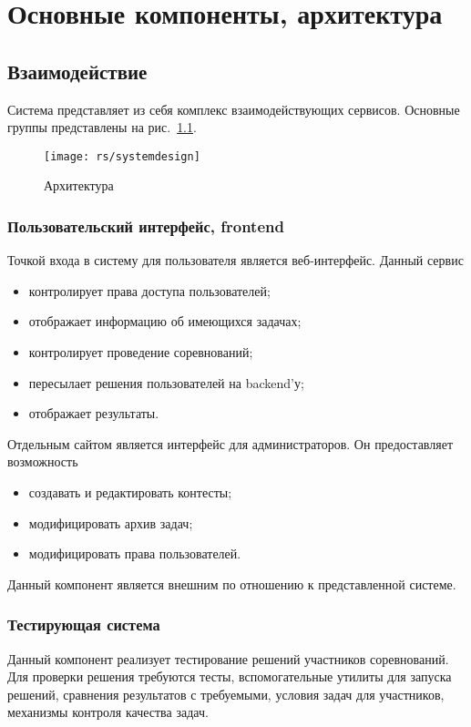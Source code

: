 \chapter{Основные компоненты, архитектура}

\section{Взаимодействие}
Система представляет из себя комплекс взаимодействующих сервисов.
Основные группы представлены на рис.~\ref{fig:systemdesign}.

\begin{figure}
    \centering
    \texttt{[image: rs/systemdesign]}
    \caption{Архитектура}
    \label{fig:systemdesign}
\end{figure}

\subsection{Пользовательский интерфейс, frontend}
Точкой входа в систему для пользователя является веб-интерфейс.
Данный сервис 
\begin{itemize}
    \item контролирует права доступа пользователей;
    \item отображает информацию об имеющихся задачах;
    \item контролирует проведение соревнований;
    \item пересылает решения пользователей на backend'у;
    \item отображает результаты.
\end{itemize}

Отдельным сайтом является интерфейс для администраторов.
Он предоставляет возможность
\begin{itemize}
    \item создавать и редактировать контесты;
    \item модифицировать архив задач;
    \item модифицировать права пользователей.
\end{itemize}

Данный компонент является внешним по отношению к представленной системе.

\subsection{Тестирующая система}
Данный компонент реализует тестирование решений участников соревнований.
Для проверки решения требуются тесты, вспомогательные утилиты для запуска решений,
сравнения результатов с требуемыми, условия задач для участников,
механизмы контроля качества задач.

